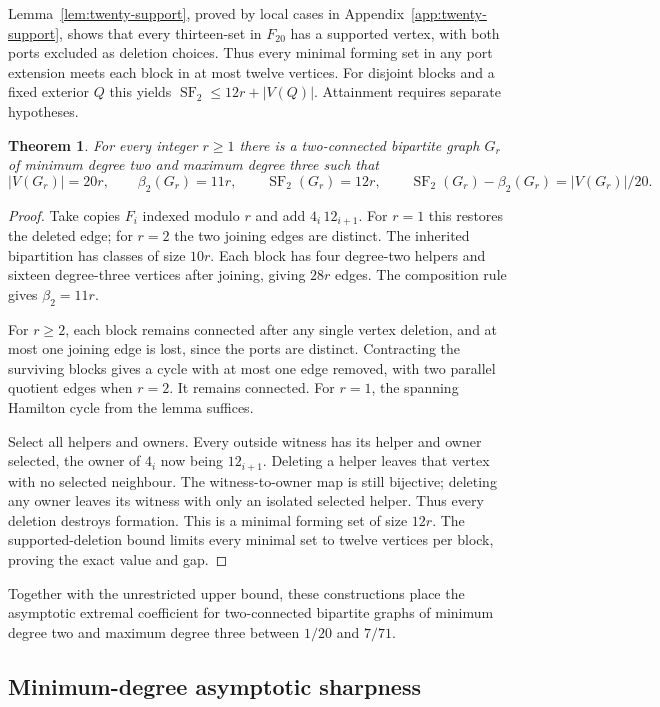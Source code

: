 \documentclass[11pt]{article}
\newtheorem{theorem}{Theorem}
\newcommand{\SF}{\operatorname{SF}_2}
\newcommand{\diss}{\beta_2}
\begin{document}
Lemma~\ref{lem:twenty-support}, proved by local cases in
Appendix~\ref{app:twenty-support}, shows that every thirteen-set in $F_{20}$
has a supported vertex, with both ports excluded as deletion choices.
Thus every minimal forming set in any port extension meets each block
in at most twelve vertices. For disjoint blocks and a fixed exterior $Q$
this yields $\SF\le12r+|V(Q)|$. Attainment requires separate hypotheses.

\begin{theorem}\label{thm:twenty-cycle}
For every integer $r\ge1$ there is a two-connected bipartite graph $G_r$
of minimum degree two and maximum degree three such that
\[
 |V(G_r)|=20r,\qquad \diss(G_r)=11r,\qquad
 \SF(G_r)=12r,\qquad \SF(G_r)-\diss(G_r)= |V(G_r)|/20.
\]
\end{theorem}
\begin{proof}
Take copies $F_i$ indexed modulo $r$ and add $4_i\,12_{i+1}$.
For $r=1$ this restores the deleted edge; for $r=2$ the two joining edges
are distinct. The inherited bipartition has classes of size $10r$.
Each block has four degree-two helpers and sixteen degree-three vertices
after joining, giving $28r$ edges. The composition rule gives $\diss=11r$.

For $r\ge2$, each block remains connected after any single vertex deletion,
and at most one joining edge is lost, since the ports are distinct.
Contracting the surviving blocks gives a cycle with at most one edge
removed, with two parallel quotient edges when $r=2$. It remains connected.
For $r=1$, the spanning Hamilton cycle from the lemma suffices.

Select all helpers and owners. Every outside witness has its helper and
owner selected, the owner of $4_i$ now being $12_{i+1}$. Deleting a helper
leaves that vertex with no selected neighbour. The witness-to-owner map
is still bijective; deleting any owner leaves its witness with only an
isolated selected helper. Thus every deletion destroys formation.
This is a minimal forming set of size $12r$. The supported-deletion bound
limits every minimal set to twelve vertices per block, proving the exact
value and gap.
\end{proof}

Together with the unrestricted upper bound, these constructions place the
asymptotic extremal coefficient for two-connected bipartite graphs of
minimum degree two and maximum degree three between $1/20$ and $7/71$.

\subsection{Minimum-degree asymptotic sharpness}
\end{document}
